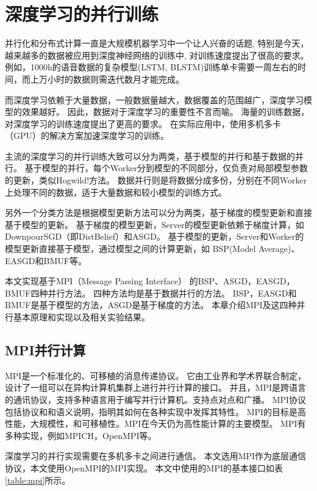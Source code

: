 ﻿%
\chapter{深度学习的并行训练}

并行化和分布式计算一直是大规模机器学习中一个让人兴奋的话题, 特别是今天，越来越多的数据被应用到深度神经网络的训练中, 对训练速度提出了很高的要求。
例如，1000h的语音数据的复杂模型(LSTM, BLSTM)训练单卡需要一周左右的时间，而上万小时的数据则需迭代数月才能完成。

而深度学习依赖于大量数据，一般数据量越大，数据覆盖的范围越广，深度学习模型的效果越好。
因此，数据对于深度学习的重要性不言而喻。
海量的训练数据，对深度学习的训练速度提出了更高的要求。
在实际应用中，使用多机多卡（GPU）的解决方案加速深度学习的训练。

主流的深度学习的并行训练大致可以分为两类，基于模型的并行和基于数据的并行。
基于模型的并行，每个Worker分到模型的不同部分，仅负责对局部模型参数的更新，类似Hogwild!方法。
数据并行则是将数据分成多份，分别在不同Worker上处理不同的数据，适于大量数据和较小模型的训练方式。

另外一个分类方法是根据模型更新方法可以分为两类，基于梯度的模型更新和直接基于模型的更新。
基于梯度的模型更新，Server的模型更新依赖于梯度计算，如DownpourSGD（即DistBelief）和ASGD。
基于模型的更新，Server和Worker的模型更新直接基于模型，通过模型之间的计算更新，如 BSP(Model Average)、EASGD和BMUF等。

本文实现基于MPI（Message Passing Interface） 的BSP、ASGD，EASGD，BMUF四种并行方法。
四种方法均是基于数据并行的方法。
BSP，EASGD和BMUF是基于模型的方法，ASGD是基于梯度的方法。
本章介绍MPI及这四种并行基本原理和实现以及相关实验结果。

\section{MPI并行计算}

MPI是一个标准化的、可移植的消息传递协议。
它由工业界和学术界联合制定，设计了一组可以在异构计算机集群上进行并行计算的接口。
并且，MPI是跨语言的通讯协议，支持多种语言用于编写并行计算机。支持点对点和广播。
MPI协议包括协议和和语义说明，指明其如何在各种实现中发挥其特性。
MPI的目标是高性能，大规模性，和可移植性。MPI在今天仍为高性能计算的主要模型。
MPI有多种实现，例如MPICH，OpenMPI等。

深度学习的并行实现需要在多机多卡之间进行通信。
本文选用MPI作为底层通信协议，本文使用OpenMPI的MPI实现。
本文中使用的MPI的基本接口如表\ref{table:mpi}所示。

